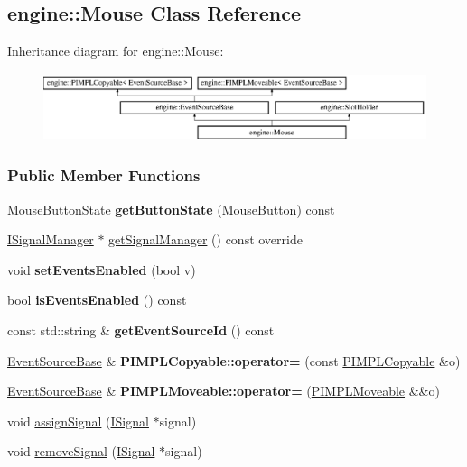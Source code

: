 \hypertarget{a00057}{}\subsection{engine\+:\+:Mouse Class Reference}
\label{a00057}
Inheritance diagram for engine\+:\+:Mouse\+:\begin{figure}[H]
\begin{center}
\leavevmode
\includegraphics[height=1.985816cm]{a00057}
\end{center}
\end{figure}
\subsubsection*{Public Member Functions}
\begin{DoxyCompactItemize}
\item 
Mouse\+Button\+State {\bfseries get\+Button\+State} (Mouse\+Button) const \hypertarget{a00057_a91c3072a154c629723e7fb83ea58c453}{}\label{a00057_a91c3072a154c629723e7fb83ea58c453}

\item 
\hyperlink{a00051}{I\+Signal\+Manager} $\ast$ \hyperlink{a00057_a655d612dbf601fec2b116a1c94198247}{get\+Signal\+Manager} () const  override
\item 
void {\bfseries set\+Events\+Enabled} (bool v)\hypertarget{a00036_ae529242181c16462bef9bd6b8fb56b93}{}\label{a00036_ae529242181c16462bef9bd6b8fb56b93}

\item 
bool {\bfseries is\+Events\+Enabled} () const \hypertarget{a00036_a659325f18d666f132f380e4319499572}{}\label{a00036_a659325f18d666f132f380e4319499572}

\item 
const std\+::string \& {\bfseries get\+Event\+Source\+Id} () const \hypertarget{a00036_ad41deeb2b9de38797b10777e5d1ecf13}{}\label{a00036_ad41deeb2b9de38797b10777e5d1ecf13}

\item 
\hyperlink{a00036}{Event\+Source\+Base} \& {\bfseries P\+I\+M\+P\+L\+Copyable\+::operator=} (const \hyperlink{a00060}{P\+I\+M\+P\+L\+Copyable} \&o)\hypertarget{a00060_a26fdb9b3d449d04dc653c7ae942f452b}{}\label{a00060_a26fdb9b3d449d04dc653c7ae942f452b}

\item 
\hyperlink{a00036}{Event\+Source\+Base} \& {\bfseries P\+I\+M\+P\+L\+Moveable\+::operator=} (\hyperlink{a00061}{P\+I\+M\+P\+L\+Moveable} \&\&o)\hypertarget{a00061_ac67025e8a25edffe99fa9bf67ed8ca19}{}\label{a00061_ac67025e8a25edffe99fa9bf67ed8ca19}

\item 
void \hyperlink{a00070_afd9ce54a72b4dd397d82aff6c387d0c0}{assign\+Signal} (\hyperlink{a00050}{I\+Signal} $\ast$signal)
\item 
void \hyperlink{a00070_a5927b57f0d4fb8744dc0e8ec265e0136}{remove\+Signal} (\hyperlink{a00050}{I\+Signal} $\ast$signal)
\end{DoxyCompactItemize}
